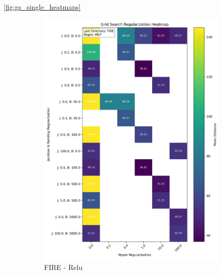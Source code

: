 \ref{fig:gs_single_heatmaps}

\begin{figure}[ht]
    \centering
    \begin{subfigure}[b]{0.45\textwidth}
        \centering
        \includegraphics[width=\textwidth]{imaxes/grid_search_single_heatmap_FIRE_MLP.png}
        \caption{FIRE - Relu}
        \label{fig:gs_single_FIRE_MLP}
    \end{subfigure}\hfill
    \begin{subfigure}[b]{0.45\textwidth}
        \centering

\end{subfigure}
\end{figure}
